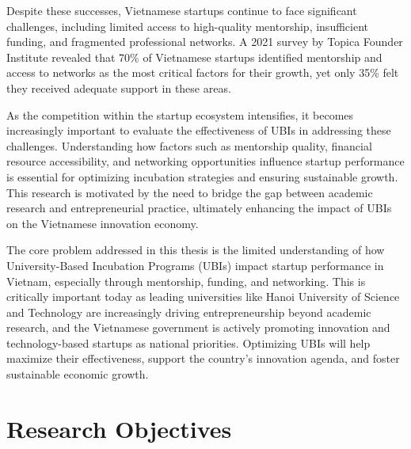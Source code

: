 \documentclass[../Main.tex]{subfiles}
\begin{document}
	Despite these successes, Vietnamese startups continue to face significant challenges, including limited access to high-quality mentorship, insufficient funding, and fragmented professional networks. A 2021 survey by Topica Founder Institute revealed that 70\% of Vietnamese startups identified mentorship and access to networks as the most critical factors for their growth, yet only 35\% felt they received adequate support in these areas.

	As the competition within the startup ecosystem intensifies, it becomes increasingly important to evaluate the effectiveness of UBIs in addressing these challenges. Understanding how factors such as mentorship quality, financial resource accessibility, and networking opportunities influence startup performance is essential for optimizing incubation strategies and ensuring sustainable growth. This research is motivated by the need to bridge the gap between academic research and entrepreneurial practice, ultimately enhancing the impact of UBIs on the Vietnamese innovation economy.

	\begin{condensed_idea}
		The core problem addressed in this thesis is the limited understanding of how University-Based Incubation Programs (UBIs) impact startup performance in Vietnam, especially through mentorship, funding, and networking. This is critically important today as leading universities like Hanoi University of Science and Technology are increasingly driving entrepreneurship beyond academic research, and the Vietnamese government is actively promoting innovation and technology-based startups as national priorities. Optimizing UBIs will help maximize their effectiveness, support the country's innovation agenda, and foster sustainable economic growth.
	\end{condensed_idea}

	\section{Research Objectives}
	\label{section:1.2_Research_objectives}
\end{document}
